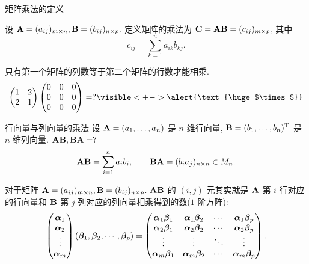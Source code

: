 \begin{frame}{矩阵乘法的定义}
	\onslide<+->
	\begin{definition}
		设 ${\mathbf{A}}=(a_{ij})_{m\times n}, {\mathbf{B}}=(b_{ij})_{n\times p}$.
		定义矩阵的乘法为  ${\mathbf{C}}={\mathbf{A}}{\mathbf{B}}=(c_{ij})_{m\times p}$, 其中
		\[c_{ij}=\sum_{k=1}^n a_{ik}b_{kj}.\]
	\end{definition}
	\onslide<+->
	只有第一个矩阵的列数等于第二个矩阵的行数才能相乘.
	\onslide<+->
	\[\begin{pmatrix}
		1&2\\2&1
	\end{pmatrix}\begin{pmatrix}
		0&0&0\\0&0&0\\0&0&0
	\end{pmatrix}=?\visible<+->{\alert{\text{\huge$\times$}}}\]
\end{frame}


\begin{frame}{行向量与列向量的乘法}
	\onslide<+->
	设 ${\mathbf{A}}=(a_1,\dots,a_n)$ 是 $n$ 维行向量, ${\mathbf{B}}=(b_1,\dots,b_n)^{\mathrm{T}}$ 是 $n$ 维列向量.
	\onslide<+->
	${\mathbf{A}}{\mathbf{B}},{\mathbf{B}}{\mathbf{A}}=?$
	\onslide<+->
	\[{\mathbf{A}}{\mathbf{B}}=\sum_{i=1}^n a_i b_i,\qquad
	{\mathbf{B}}{\mathbf{A}}=(b_ia_j)_{n\times n}\in M_n.\]

	\onslide<+->
	对于矩阵 ${\mathbf{A}}=(a_{ij})_{m\times n}, {\mathbf{B}}=(b_{ij})_{n\times p}$.
	\onslide<+->
	${\mathbf{A}}{\mathbf{B}}$ 的 $(i,j)$ 元其实就是 ${\mathbf{A}}$ 第 $i$ 行对应的行向量和 ${\mathbf{B}}$ 第 $j$ 列对应的列向量相乘得到的数($1$ 阶方阵):
	\[\begin{pmatrix}
		{\boldsymbol{\alpha}}_1\\
		{\boldsymbol{\alpha}}_2\\
		\vdots\\
		{\boldsymbol{\alpha}}_m
	\end{pmatrix}({\boldsymbol{\beta}}_1,{\boldsymbol{\beta}}_2,\cdots,{\boldsymbol{\beta}}_p)=\begin{pmatrix}
		{\boldsymbol{\alpha}}_1{\boldsymbol{\beta}}_1&{\boldsymbol{\alpha}}_1{\boldsymbol{\beta}}_2&\cdots&{\boldsymbol{\alpha}}_1{\boldsymbol{\beta}}_p\\
		{\boldsymbol{\alpha}}_2{\boldsymbol{\beta}}_1&{\boldsymbol{\alpha}}_2{\boldsymbol{\beta}}_2&\cdots&{\boldsymbol{\alpha}}_2{\boldsymbol{\beta}}_p\\
		\vdots&\vdots&\ddots&\vdots\\
		{\boldsymbol{\alpha}}_m{\boldsymbol{\beta}}_1&{\boldsymbol{\alpha}}_m{\boldsymbol{\beta}}_2&\cdots&{\boldsymbol{\alpha}}_m{\boldsymbol{\beta}}_p
	\end{pmatrix}.\]
\end{frame}


